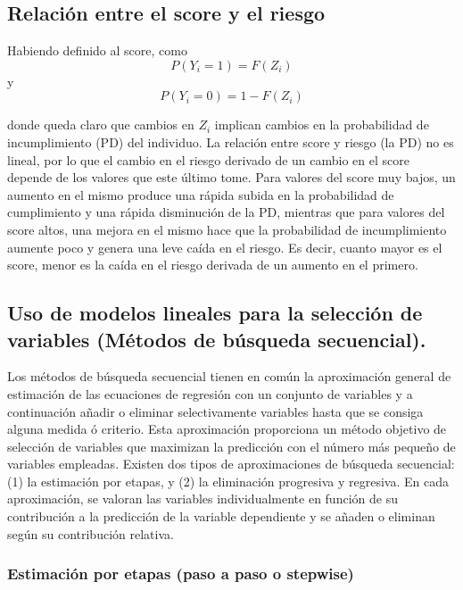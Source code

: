 \documentclass[
  12pt,
]{krantz}
\theoremstyle{definition}
\theoremstyle{definition}
\theoremstyle{definition}
\theoremstyle{remark}
\begin{document}
\hypertarget{relacion-entre-el-score-y-el-riesgo}{%
\subsection{Relación entre el score y el riesgo}\label{relacion-entre-el-score-y-el-riesgo}}

Habiendo definido al score, como \[P(Y_i=1)=F(Z_i)\] y \[P(Y_i=0)=1-F(Z_i)\]

donde queda claro que cambios en \(Z_i\) implican cambios en la probabilidad de incumplimiento (PD) del individuo. La relación entre score y riesgo (la PD) no es lineal, por lo que el cambio en el riesgo derivado de un cambio en el score depende de los valores que este último tome. Para valores del score muy bajos, un aumento en el mismo produce una rápida subida en la probabilidad de cumplimiento y una rápida disminución de la PD, mientras que para valores del score altos, una mejora en el mismo hace que la probabilidad de incumplimiento aumente poco y genera una leve caída en el riesgo. Es decir, cuanto mayor es el score, menor es la caída en el riesgo derivada de un aumento en el primero.

\hypertarget{uso-de-modelos-lineales-para-la-seleccion-de-variables-metodos-de-busqueda-secuencial.}{%
\subsection{Uso de modelos lineales para la selección de variables (Métodos de búsqueda secuencial).}\label{uso-de-modelos-lineales-para-la-seleccion-de-variables-metodos-de-busqueda-secuencial.}}

Los métodos de búsqueda secuencial tienen en común la aproximación general de estimación de las ecuaciones de regresión con un conjunto de variables y a continuación añadir o eliminar selectivamente variables hasta que se consiga alguna medida ó criterio. Esta aproximación proporciona un método objetivo de selección de variables que maximizan la predicción con el número más pequeño de variables empleadas. Existen dos tipos de aproximaciones de búsqueda secuencial: (1) la estimación por etapas, y (2) la eliminación progresiva y regresiva. En cada aproximación, se valoran las variables individualmente en función de su contribución a la predicción de la variable dependiente y se añaden o eliminan según su contribución relativa.

\hypertarget{estimacion-por-etapas-paso-a-paso-o-stepwise}{%
\subsubsection{Estimación por etapas (paso a paso o stepwise)}\label{estimacion-por-etapas-paso-a-paso-o-stepwise}}
\end{document}
